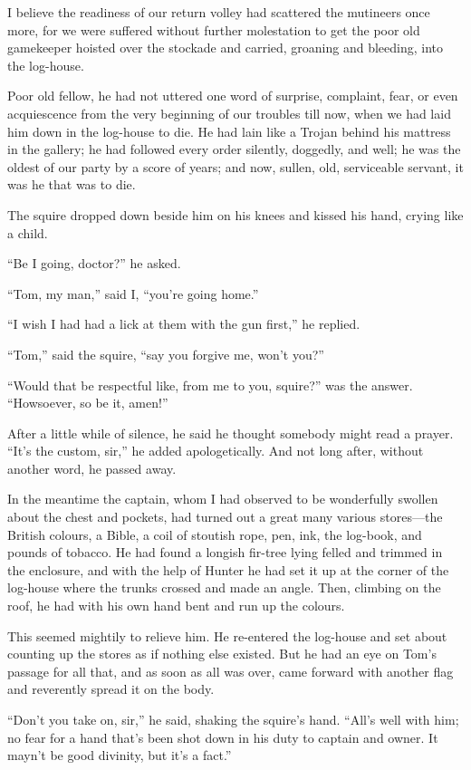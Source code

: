 I believe the readiness of our return volley had scattered the mutineers once more, for we were suffered without further molestation to get the poor old gamekeeper hoisted over the stockade and carried, groaning and bleeding, into the log-house.

Poor old fellow, he had not uttered one word of surprise, complaint, fear, or even acquiescence from the very beginning of our troubles till now, when we had laid him down in the log-house to die. He had lain like a Trojan behind his mattress in the gallery; he had followed every order silently, doggedly, and well; he was the oldest of our party by a score of years; and now, sullen, old, serviceable servant, it was he that was to die.

The squire dropped down beside him on his knees and kissed his hand, crying like a child.

\enquote{Be I going, doctor?} he asked.

\enquote{Tom, my man,} said I, \enquote{you’re going home.}

\enquote{I wish I had had a lick at them with the gun first,} he replied.

\enquote{Tom,} said the squire, \enquote{say you forgive me, won’t you?}

\enquote{Would that be respectful like, from me to you, squire?} was the answer. \enquote{Howsoever, so be it, amen!}

After a little while of silence, he said he thought somebody might read a prayer. \enquote{It’s the custom, sir,} he added apologetically. And not long after, without another word, he passed away.

In the meantime the captain, whom I had observed to be wonderfully swollen about the chest and pockets, had turned out a great many various stores---the British colours, a Bible, a coil of stoutish rope, pen, ink, the log-book, and pounds of tobacco. He had found a longish fir-tree lying felled and trimmed in the enclosure, and with the help of Hunter he had set it up at the corner of the log-house where the trunks crossed and made an angle. Then, climbing on the roof, he had with his own hand bent and run up the colours.

This seemed mightily to relieve him. He re-entered the log-house and set about counting up the stores as if nothing else existed. But he had an eye on Tom’s passage for all that, and as soon as all was over, came forward with another flag and reverently spread it on the body.

\enquote{Don’t you take on, sir,} he said, shaking the squire’s hand. \enquote{All’s well with him; no fear for a hand that’s been shot down in his duty to captain and owner. It mayn’t be good divinity, but it’s a fact.}

